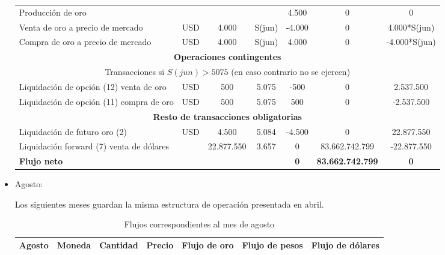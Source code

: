 \documentclass{article}
\theoremstyle{remark}
\theoremstyle{definition}
\begin{document}
\begin{itemize}
\begin{table}[H]
\begin{tabular}{l|c c c|c c c}
Producción de oro 
&  &  &  & 4.500 & 0 & 0 \\

Venta de oro a precio de mercado 
& USD & 4.000 & S(jun) & -4.000 & 0 & 4.000*S(jun) \\

Compra de oro a precio de mercado 
& USD & 4.000 & S(jun) & 4.000 & 0 & -4.000*S(jun) \\

\midrule
\multicolumn{7}{c}{\textbf{Operaciones contingentes}} \\
\multicolumn{7}{c}{Transacciones si $S(jun) > 5075$ (en caso contrario no se ejercen)} \\
\midrule

Liquidación de opción (12) venta de oro 
& USD & 500 & 5.075 & -500 & 0 & 2.537.500 \\

Liquidación de opción (11) compra de oro 
& USD & 500 & 5.075 & 500 & 0 & -2.537.500 \\

\midrule
\multicolumn{7}{c}{\textbf{Resto de transacciones obligatorias}} \\
\midrule

Liquidación de futuro oro (2) 
& USD & 4.500 & 5.084 & -4.500 & 0 & 22.877.550 \\

Liquidación forward (7) venta de dólares 
&  & 22.877.550 & 3.657 & 0 & 83.662.742.799 & -22.877.550 \\

\midrule

\textbf{Flujo neto} 
& \textbf{} 
& \textbf{} 
& \textbf{} 
& \textbf{0} 
& \textbf{83.662.742.799} 
& \textbf{0} \\

\bottomrule
\end{tabular}
\end{table}

\item Agosto: 

Los siguientes meses guardan la misma estructura de operación presentada en abril.

\begin{table}[H]
\centering
\caption{Flujos correspondientes al mes de agosto}
\footnotesize
\renewcommand{\arraystretch}{1.2}

\begin{tabular}{l|c c c|c c c}
\toprule
\textbf{Agosto} & 
\textbf{Moneda} & 
\textbf{Cantidad} & 
\textbf{Precio} & 
\textbf{Flujo de oro} & 
\textbf{Flujo de pesos} & 
\textbf{Flujo de dólares} \\
\midrule


\end{tabular}
\end{table}
\end{itemize}
\end{document}
